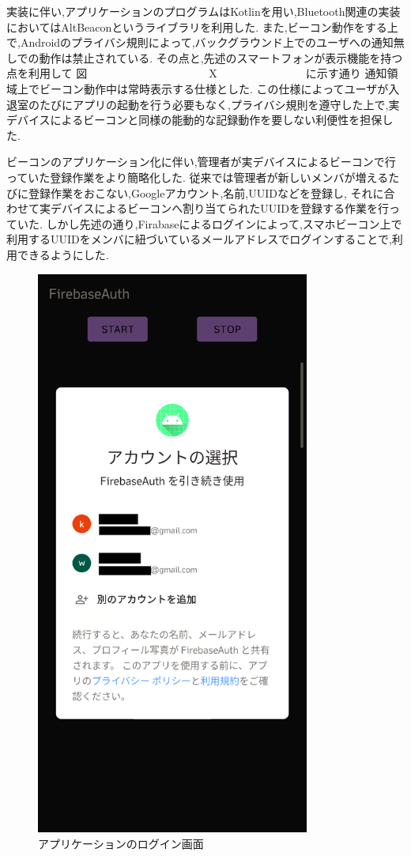 実装に伴い,アプリケーションのプログラムはKotlinを用い,Bluetooth関連の実装においてはAltBeaconというライブラリを利用した.
また,ビーコン動作をする上で,Androidのプライバシ規則によって,バックグラウンド上でのユーザへの通知無しでの動作は禁止されている.
その点と,先述のスマートフォンが表示機能を持つ点を利用して 図　　　　　　　　　　　X　　　　　　　　に示す通り   通知領域上でビーコン動作中は常時表示する仕様とした.
この仕様によってユーザが入退室のたびにアプリの起動を行う必要もなく,プライバシ規則を遵守した上で,実デバイスによるビーコンと同様の能動的な記録動作を要しない利便性を担保した.




ビーコンのアプリケーション化に伴い,管理者が実デバイスによるビーコンで行っていた登録作業をより簡略化した.
従来では管理者が新しいメンバが増えるたびに登録作業をおこない,Googleアカウント,名前,UUIDなどを登録し,
それに合わせて実デバイスによるビーコンへ割り当てられたUUIDを登録する作業を行っていた.
しかし先述の通り,Firabaseによるログインによって,スマホビーコン上で利用するUUIDをメンバに紐づいているメールアドレスでログインすることで,利用できるようにした.
\begin{figure}[tbh]
  \centering
  \includegraphics[width=9cm]{image/AppSignIn.png}
  \caption{アプリケーションのログイン画面}
  \label{multipleBPM}
\end{figure}


